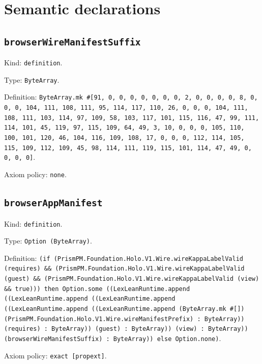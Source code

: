 \documentclass[11pt]{article}
\begin{document}
\section*{Semantic declarations}
\subsection*{\texttt{browserWireManifestSuffix}}
\noindent Kind: \texttt{definition}.\par
\noindent Type: \texttt{ByteArray}.\par
\noindent Definition: \texttt{ByteArray.mk \#[91, 0, 0, 0, 0, 0, 0, 0, 2, 0, 0, 0, 0, 8, 0, 0, 0, 104, 111, 108, 111, 95, 114, 117, 110, 26, 0, 0, 0, 104, 111, 108, 111, 103, 114, 97, 109, 58, 103, 117, 101, 115, 116, 47, 99, 111, 114, 101, 45, 119, 97, 115, 109, 64, 49, 3, 10, 0, 0, 0, 105, 110, 100, 101, 120, 46, 104, 116, 109, 108, 17, 0, 0, 0, 112, 114, 105, 115, 109, 112, 109, 45, 98, 114, 111, 119, 115, 101, 114, 47, 49, 0, 0, 0, 0]}.\par
\noindent Axiom policy: \texttt{none}.\par
\subsection*{\texttt{browserAppManifest}}
\noindent Kind: \texttt{definition}.\par
\noindent Type: \texttt{Option (ByteArray)}.\par
\noindent Definition: \texttt{(if (PrismPM.Foundation.Holo.V1.Wire.wireKappaLabelValid (requires) \&\& (PrismPM.Foundation.Holo.V1.Wire.wireKappaLabelValid (guest) \&\& (PrismPM.Foundation.Holo.V1.Wire.wireKappaLabelValid (view) \&\& true))) then Option.some ((LexLeanRuntime.append ((LexLeanRuntime.append ((LexLeanRuntime.append ((LexLeanRuntime.append ((LexLeanRuntime.append (ByteArray.mk \#[]) (PrismPM.Foundation.Holo.V1.Wire.wireManifestPrefix) : ByteArray)) (requires) : ByteArray)) (guest) : ByteArray)) (view) : ByteArray)) (browserWireManifestSuffix) : ByteArray)) else Option.none)}.\par
\noindent Axiom policy: \texttt{exact [propext]}.\par
\end{document}
